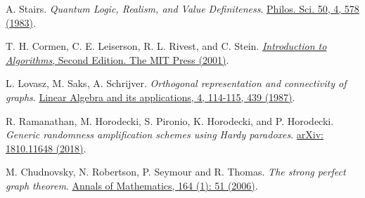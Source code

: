 \documentclass[twocolumn, a4paper, superscriptaddress,nofootinbib, accepted=2020-08-07, hyperref]{quantumarticle}
\def\textbf#1{{\bf #1}}
\begin{document}
\begin{thebibliography}{99}
A. Stairs. \textit{Quantum Logic, Realism, and Value Definiteness}. \href{https://www.jstor.org/stable/187557}{Philos. Sci. 50, 4, 578 (1983)}.




T. H. Cormen, C. E. Leiserson, R. L. Rivest, and C. Stein. \href{https://mitpress.mit.edu/books/introduction-algorithms-second-edition}{\textit{Introduction to Algorithms}, Second Edition. The MIT Press (2001)}.


L. Lovasz, M. Saks, A. Schrijver. \textit{Orthogonal representation and connectivity
of graphs}. \href{https://doi.org/10.1016/0024-3795(89)90475-8}{Linear Algebra and its applications, 4, 114-115, 439 (1987)}. 

R. Ramanathan, M. Horodecki, S. Pironio, K. Horodecki, and P. Horodecki. \textit{Generic randomness amplification schemes using Hardy paradoxes}. \href{https://arxiv.org/abs/1810.11648}{arXiv: 1810.11648 (2018)}.



M. Chudnovsky, N. Robertson, P. Seymour and R. Thomas.  \textit{The strong perfect graph theorem}. \href{https://doi.org/10.4007/annals.2006.164.51}{Annals of Mathematics, 164 (1): 51 (2006)}.


\end{thebibliography}
\end{document}
